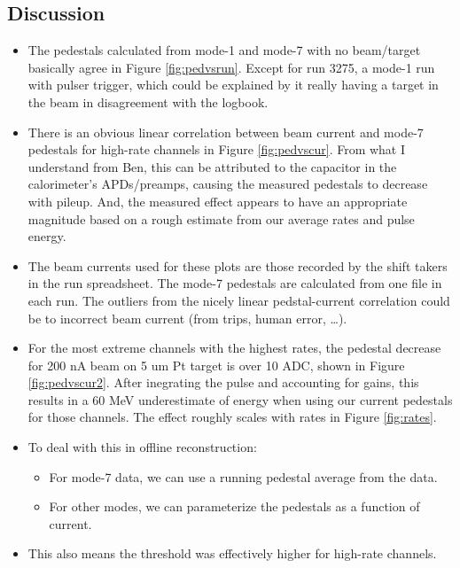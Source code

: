 \documentclass[amsmath,amssymb,notitlepage,12pt]{revtex4-1}
\begin{document}
\subsection{Discussion}
\begin{itemize}
\item
    The pedestals calculated from mode-1 and mode-7 with no beam/target basically agree in Figure \ref{fig:pedvsrun}.  Except for run 3275, a mode-1 run with pulser trigger, which could be explained by it really having a target in the beam in disagreement with the logbook.
    \item
        There is an obvious linear correlation between beam current and mode-7 pedestals for high-rate channels in Figure \ref{fig:pedvscur}.  From what I understand from Ben, this can be attributed to the capacitor in the calorimeter's APDs/preamps, causing the measured pedestals to decrease with pileup.  And, the measured effect appears to have an appropriate magnitude based on a rough estimate from our average rates and pulse energy.%
\item
The beam currents used for these plots are those recorded by the shift takers in the run spreadsheet.  The mode-7 pedestals are calculated from one file in each run.  The outliers from the nicely linear pedstal-current correlation could be  to incorrect beam current (from trips, human error, \ldots).
\item
    For the most extreme channels with the highest rates, the pedestal decrease for 200 nA beam on 5 um Pt target is over 10 ADC, shown in Figure \ref{fig:pedvscur2}.  After inegrating the pulse and accounting for gains, this results in a 60 MeV underestimate of energy when using our current pedestals for those channels.  The effect roughly scales with rates in Figure \ref{fig:rates}.
\item
To deal with this in offline reconstruction:
\begin{itemize}
\item
For mode-7 data, we can use a running pedestal average from the data.
\item
For other modes, we can parameterize the pedestals as a function of current.
\end{itemize}
\item
This also means the threshold was effectively higher for high-rate channels.
\end{itemize}
\end{document}
